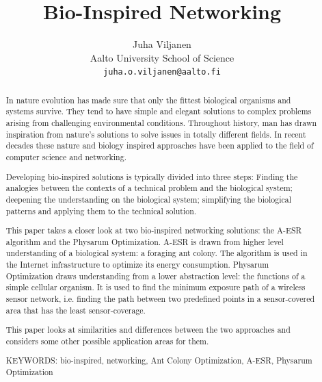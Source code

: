 \documentclass[cameraready]{IWORK2014}
\begin{document}

\title{Bio-Inspired Networking}

\author{Juha Viljanen\\
        Aalto University School of Science \\
	\texttt{juha.o.viljanen@aalto.fi}}
\maketitle


\begin{abstract}
In nature evolution has made sure that only the fittest biological organisms and systems survive. They tend to have simple and elegant solutions to complex problems arising from challenging environmental conditions. Throughout history, man has drawn inspiration from nature's solutions to solve issues in totally different fields. In recent decades these nature and biology inspired approaches have been applied to the field of computer science and networking.

Developing bio-inspired solutions is typically divided into three steps: Finding the analogies between the contexts of a technical problem and the biological system; deepening the understanding on the biological system; simplifying the biological patterns and applying them to the technical solution.

This paper takes a closer look at two bio-inspired networking solutions: the A-ESR algorithm and the Physarum Optimization. A-ESR is drawn from higher level understanding of a biological system: a foraging ant colony. The algorithm is used in the Internet infrastructure to optimize its energy consumption. Physarum Optimization draws understanding from a lower abstraction level: the functions of a simple cellular organism. It is used to find the minimum exposure path of a wireless sensor network, i.e. finding the path between two predefined points in a sensor-covered area that has the least sensor-coverage.

This paper looks at similarities and differences between the two approaches and considers some other possible application areas for them.

\vspace{3mm}
\noindent KEYWORDS: bio-inspired, networking, Ant Colony Optimization, A-ESR, Physarum Optimization

\end{abstract}
\end{document}
